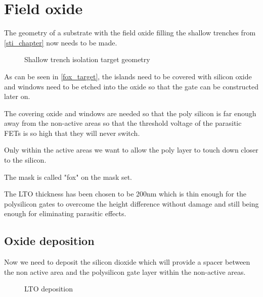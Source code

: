 \section{Field oxide}\label{fox_chapter}

The geometry of a substrate with the field oxide filling the shallow trenches from \autoref{sti_chapter} now needs to be made.

\begin{figure}[H]
	\centering
	\begin{tikzpicture}[node distance = 3cm, auto, thick,scale=\CrossAndTopSectionBig, every node/.style={transform shape}]
		
	\end{tikzpicture}
	\caption{Shallow trench isolation target geometry}
	\label{fox_target}
\end{figure}

As can be seen in \autoref{fox_target}, the islands need to be covered with silicon oxide and windows need to be etched into the oxide so that the gate can be constructed later on.

The covering oxide and windows are needed so that the poly silicon is far enough away from the non-active areas so that the threshold voltage of the parasitic FETs is so high that they will never switch.

Only within the active areas we want to allow the poly layer to touch down closer to the silicon.

The mask is called "fox" on the mask set.

The LTO thickness has been chosen to be 200nm which is thin enough for the polysilicon gates to overcome the height difference without damage and still being enough for eliminating parasitic effects.

\newpage

\subsection{Oxide deposition}

Now we need to deposit the silicon dioxide which will provide a spacer between the non active area and the polysilicon gate layer within the non-active areas.

\begin{figure}[H]
	\centering
	\begin{tikzpicture}[node distance = 3cm, auto, thick,scale=\CrossSectionOnly, every node/.style={transform shape}]
		
	\end{tikzpicture}
	\begin{tikzpicture}[node distance = 3cm, auto, thick,scale=\CrossSectionOnly, every node/.style={transform shape}]
		
	\end{tikzpicture}
	\caption{LTO deposition}
\end{figure}

